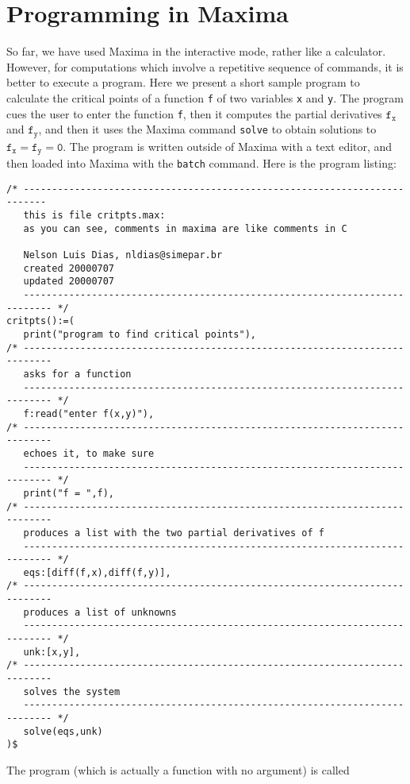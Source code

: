 \documentclass[a4paper,12pt]{article}
\begin{document}
\section{Programming in Maxima \label{sec:programming}}

So far, we have used Maxima in the interactive mode, rather like a
calculator.  However, for computations which involve a repetitive
sequence of commands, it is better to execute a program.  Here we
present a short sample program to calculate the critical points of a
function {\tt f} of two variables {\tt x} and {\tt y}.  The program
cues the user to enter the function {\tt f}, then it computes the
partial derivatives $\mathtt{f_x}$ and $\mathtt{f_y}$, and then it
uses the Maxima command {\tt solve} to obtain solutions to
$\mathtt{f_x = f_y = 0}$.  The program is written outside of Maxima
with a text editor, and then loaded into Maxima with the {\tt batch}
command.  Here is the program listing:
\begin{verbatim}
/* -------------------------------------------------------------------------- 
   this is file critpts.max: 
   as you can see, comments in maxima are like comments in C 

   Nelson Luis Dias, nldias@simepar.br
   created 20000707
   updated 20000707
   --------------------------------------------------------------------------- */
critpts():=(
   print("program to find critical points"),
/* ---------------------------------------------------------------------------
   asks for a function
   --------------------------------------------------------------------------- */
   f:read("enter f(x,y)"),
/* ---------------------------------------------------------------------------
   echoes it, to make sure
   --------------------------------------------------------------------------- */
   print("f = ",f),
/* ---------------------------------------------------------------------------
   produces a list with the two partial derivatives of f
   --------------------------------------------------------------------------- */
   eqs:[diff(f,x),diff(f,y)],
/* ---------------------------------------------------------------------------
   produces a list of unknowns
   --------------------------------------------------------------------------- */
   unk:[x,y],
/* ---------------------------------------------------------------------------
   solves the system
   --------------------------------------------------------------------------- */
   solve(eqs,unk)   
)$
\end{verbatim}
The program (which is actually a function with no argument) is called
\end{document}
